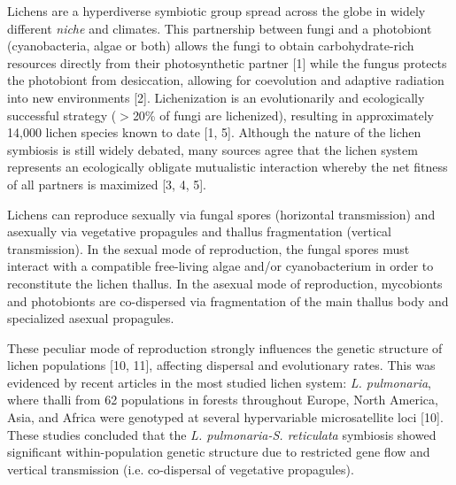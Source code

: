Lichens are a hyperdiverse symbiotic group spread across the globe in widely different {\em niche} and climates. This partnership between fungi and a photobiont (cyanobacteria, algae or both) allows the fungi to obtain carbohydrate-rich resources directly from their photosynthetic partner [1] while the fungus protects the photobiont from desiccation, allowing for coevolution and adaptive radiation into new environments [2]. Lichenization is an evolutionarily and ecologically successful strategy ($>$20\% of fungi are lichenized), resulting in approximately 14,000 lichen species known to date [1, 5]. Although the nature of the lichen symbiosis is still widely debated, many sources agree that the lichen system represents an ecologically obligate mutualistic interaction whereby the net fitness of all partners is maximized [3, 4, 5].

Lichens can reproduce sexually via fungal spores (horizontal transmission) and asexually via vegetative propagules and thallus fragmentation (vertical transmission). In the sexual mode of reproduction, the fungal spores must interact with a compatible free-living algae and/or cyanobacterium in order to reconstitute the lichen thallus. In the asexual mode of reproduction, mycobionts and photobionts are co-dispersed via fragmentation of the main thallus body and specialized asexual propagules.

These peculiar mode of reproduction strongly influences the genetic structure of lichen populations [10, 11], affecting dispersal and evolutionary rates. This was evidenced by recent articles in the most studied lichen system: {\em L. pulmonaria}, where thalli from 62 populations in forests throughout Europe, North America, Asia, and Africa were genotyped at several hypervariable microsatellite loci [10]. These studies concluded that the {\em L. pulmonaria-S. reticulata} symbiosis showed significant within-population genetic structure due to restricted gene flow and vertical transmission (i.e. co-dispersal of vegetative propagules). 

